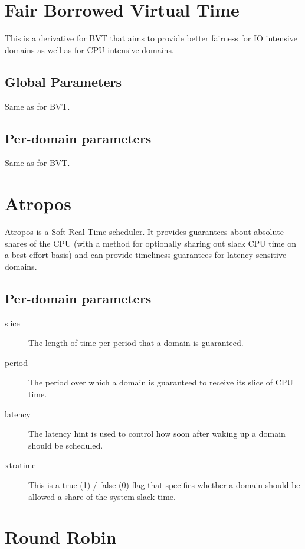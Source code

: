 \documentclass[11pt,twoside,final,openright]{xenstyle}
\begin{document}
\section{Fair Borrowed Virtual Time}

This is a derivative for BVT that aims to provide better fairness for
IO intensive domains as well as for CPU intensive domains.

\subsection{Global Parameters}

Same as for BVT.

\subsection{Per-domain parameters}

Same as for BVT.

\section{Atropos}

Atropos is a Soft Real Time scheduler.  It provides guarantees about
absolute shares of the CPU (with a method for optionally sharing out
slack CPU time on a best-effort basis) and can provide timeliness
guarantees for latency-sensitive domains.

\subsection{Per-domain parameters}

\begin{description}
\item[slice]
  The length of time per period that a domain is guaranteed.
\item[period]
  The period over which a domain is guaranteed to receive
  its slice of CPU time.
\item[latency]
  The latency hint is used to control how soon after
  waking up a domain should be scheduled.
\item[xtratime]
  This is a true (1) / false (0) flag that specifies whether
  a domain should be allowed a share of the system slack time.
\end{description}

\section{Round Robin}
\end{document}
